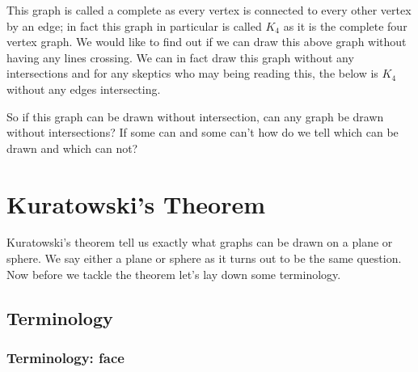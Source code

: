 \documentclass{article}
\begin{document}
This \gls{graph} is called a \gls{complete} as every \gls{vertex} is connected to every other \gls{vertex} by an \gls{edge}; in fact this \gls{graph} in particular is called $K_4$ as it is the complete four vertex \gls{graph}. We would like to find out if we can draw this above \gls{graph} without having any lines crossing. We can in fact draw this \gls{graph} without any intersections and for any skeptics who may being reading this, the below is $K_4$ without any \glspl{edge} intersecting.

\begin{center}
\end{center}

So if this \gls{graph} can be drawn without intersection, can any \gls{graph} be drawn without intersections? If some can and some can't how do we tell which can be drawn and which can not?

\section{Kuratowski's Theorem}
Kuratowski's theorem tell us exactly what \glspl{graph} can be drawn on a plane or sphere. We say either a plane or sphere as it turns out to be the same question. %
Now before we tackle the theorem let's lay down some terminology.

\subsection{Terminology}

\subsubsection{Terminology: face}
\end{document}
